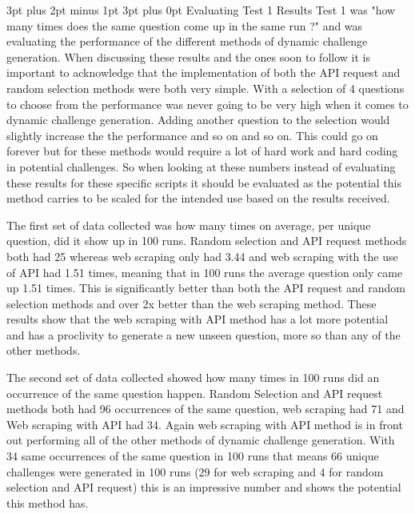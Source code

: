 \documentclass[12pt,a4paper]{article}
\makeatletter
\renewcommand\subsection{\@startsection {subsection}{1}{2mm} %
                               {3pt plus 2pt minus 1pt} %
                               {3pt plus 0pt} %
                               {\normalfont\bfseries}}
\makeatother
\begin{document}
\subsection{Evaluating Test 1 Results}   
Test 1 was "how many times does the same question come up in the same run ?" and was evaluating the performance of the different methods of dynamic challenge generation. When discussing these results and the ones soon to follow it is important to acknowledge that the implementation of both the API request and random selection methods were both very simple. With a selection of 4 questions to choose from the performance was never going to be very high when it comes to dynamic challenge generation. Adding another question to the selection would slightly increase the the performance and so on and so on. This could go on forever but for these methods would require a lot of hard work and hard coding in potential challenges. So when looking at these numbers instead of evaluating these results for these specific scripts it should be evaluated as the potential this method carries to be scaled for the intended use based on the results received.  

The first set of data collected was how many times on average, per unique question, did it show up in 100 runs. Random selection and API request methods both had 25 whereas web scraping only had 3.44 and web scraping with the use of API had 1.51 times, meaning that in 100 runs the average question only came up 1.51 times. This is significantly better than both the API request and random selection methods and over 2x better than the web scraping method. These results show that the web scraping with API method has a lot more potential and has a proclivity to generate a new unseen question, more so than any of the other methods. 

The second set of data collected showed how many times in 100 runs did an occurrence of the same question happen. Random Selection and API request methods both had 96 occurrences of the same question, web scraping had 71 and Web scraping with API had 34. Again web scraping with API method is in front out performing all of the other methods of dynamic challenge generation. With 34 same occurrences of the same question in 100 runs that means 66 unique challenges were generated in 100 runs (29 for web scraping and 4 for random selection and API request) this is an impressive number and shows the potential this method has. 
\end{document}
